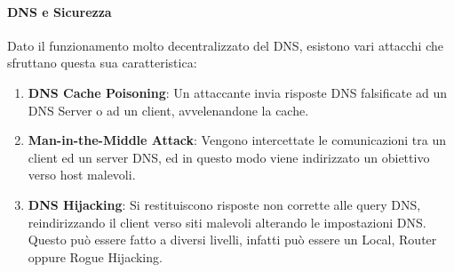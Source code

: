 \documentclass{article}
\begin{document}
\paragraph{DNS e Sicurezza} Dato il funzionamento molto decentralizzato del DNS, esistono vari attacchi che sfruttano questa sua caratteristica:

\begin{enumerate}
    \item \textbf{DNS Cache Poisoning}: Un attaccante invia risposte DNS falsificate ad un DNS Server o ad un client, avvelenandone la cache.
    \item \textbf{Man-in-the-Middle Attack}: Vengono intercettate le comunicazioni tra un client ed un server DNS, ed in questo modo viene indirizzato un obiettivo verso host malevoli.
    \item \textbf{DNS Hijacking}: Si restituiscono risposte non corrette alle query DNS, reindirizzando il client verso siti malevoli alterando le impostazioni DNS. Questo può essere fatto
    a diversi livelli, infatti può essere un Local, Router oppure Rogue Hijacking.
\end{enumerate}

\end{document}
